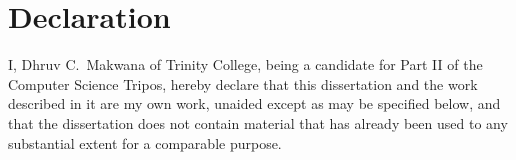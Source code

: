 \newpage
\section*{Declaration}

I, Dhruv C.\ Makwana of Trinity College, being a candidate for Part II of the
Computer Science Tripos, hereby declare that this dissertation and the work
described in it are my own work, unaided except as may be specified below, and
that the dissertation does not contain material that has already been used to
any substantial extent for a comparable purpose.

\bigskip
{}

\bigskip
{}
